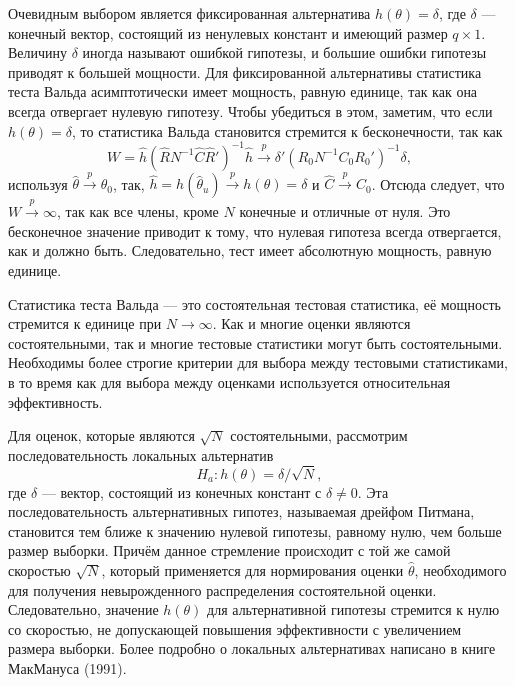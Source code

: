 Очевидным выбором является фиксированная альтернатива $h(\theta) = \delta$, где $\delta$ --- конечный вектор, состоящий из  ненулевых констант и имеющий размер $q \times 1$. Величину $\delta$ иногда называют ошибкой гипотезы, и большие ошибки гипотезы приводят к большей мощности. Для фиксированной альтернативы статистика теста Вальда асимптотически имеет мощность, равную единице, так как она всегда отвергает нулевую гипотезу. Чтобы убедиться в этом, заметим, что если $h(\theta) = \delta$, то статистика Вальда становится стремится к бесконечности, так как 
\begin{equation}
W = \hat{h}(\hat{R}N^{-1}\hat{C}\hat{R}')^{-1}\hat{h} \stackrel{p}{\rightarrow} \delta'(R_0N^{-1}C_0R_0')^{-1}\delta,
\end{equation}
используя $\hat{\theta} \stackrel{p}{\rightarrow} \theta_0$, так, $\hat{h} = h(\hat{\theta}_u) \stackrel{p}{\rightarrow} h(\theta) = \delta$ и $\hat{C} \stackrel{p}{\rightarrow} C_0$. Отсюда следует, что $W \stackrel{p}{\rightarrow} \infty$, так как все члены, кроме $N$ конечные и отличные от нуля. Это бесконечное значение приводит к тому, что нулевая гипотеза всегда отвергается, как и должно быть. Следовательно, тест имеет абсолютную мощность, равную единице.

Статистика теста Вальда --- это состоятельная тестовая статистика, её мощность стремится к единице при $N \rightarrow \infty$. Как и многие оценки являются состоятельными, так и многие тестовые статистики могут быть состоятельными. Необходимы более строгие критерии для выбора между тестовыми статистиками, в то время как для выбора между оценками используется относительная эффективность.

Для оценок, которые являются $\sqrt{N}$ состоятельными, рассмотрим последовательность локальных альтернатив
\begin{equation}
H_a: h(\theta) = \delta/\sqrt{N},
\end{equation}
где $\delta$ --- вектор, состоящий из конечных констант с $\delta \not= 0$. Эта последовательность альтернативных гипотез, называемая дрейфом Питмана, становится тем ближе к значению нулевой гипотезы, равному нулю, чем больше размер выборки. Причём данное стремление происходит с той же самой скоростью $\sqrt{N}$, который применяется для нормирования оценки $\hat{\theta}$, необходимого для получения невырожденного распределения состоятельной оценки. Следовательно, значение $h(\theta)$ для альтернативной гипотезы стремится к нулю со скоростью, не допускающей  повышения эффективности с увеличением размера выборки. Более подробно о локальных альтернативах написано в книге МакМануса (1991).

